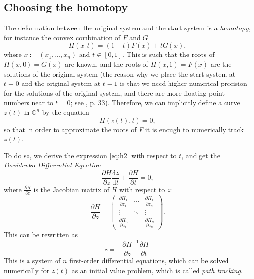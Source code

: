 \documentclass[a4paper]{article}
\newcommand{\C}{\mathbb{C}}
\theoremstyle{definition}
\theoremstyle{definition}
\theoremstyle{remark}
\theoremstyle{definition}
\begin{document}
\subsection{Choosing the homotopy}
The deformation between the original system and the start system is a \textit{homotopy}, for instance the convex combination of $F$ and $G$
\begin{equation}\label{eq:h1} H(x,t)=(1-t)F(x)+tG(x) ,\end{equation}
where $x:=(x_1,\ldots,x_n)$ and $t\in[0,1].$ This is such that the roots of $H(x,0)=G(x)$ are known, and the roots of $H(x,1)=F(x)$ are the solutions of the original system (the
reason why we place the start system at $t=0$ and the original system at $t=1$ is that we need higher numerical precision for the solutions of the original system, and there are more
floating point numbers near to $t=0$; see \cite{BertiniBook}, p. 33).
Therefore, we can implicitly
define a curve $z(t)$ in $\C^n$ by the equation \begin{equation}\label{eq:h2} H(z(t),t)=0,\end{equation} so that in order to approximate the roots of $F$ it is enough to numerically track $z(t)$.

To do so, we derive the expression \eqref{eq:h2} with respect to $t$, and get the \textit{Davidenko Differential Equation}
$$ \frac{\partial H}{\partial z}\frac{\mathrm{d} z}{\mathrm{d} t}+\frac{\partial H}{\partial t}=0 ,$$
where $\frac{\partial H}{\partial z}$ is the Jacobian matrix of $H$ with respect to $z$:
$$
\frac{\partial H}{\partial z}=
\begin{pmatrix}
    \frac{\partial H_1}{\partial z_1} & \cdots & \frac{\partial H_1}{\partial z_n}\\
    \vdots & \ddots & \vdots\\
    \frac{\partial H_n}{\partial z_1} & \cdots & \frac{\partial H_n}{\partial z_n}
\end{pmatrix} .
$$
This can be rewritten as
\begin{equation}\label{eq:dav} \dot{z}=-\frac{\partial H}{\partial z}^{-1}\frac{\partial H}{\partial t} .\end{equation}
This is a system of $n$ first-order differential equations, which can be solved numerically for $z(t)$ as an initial value problem, which is called \textit{path tracking}.
\end{document}

